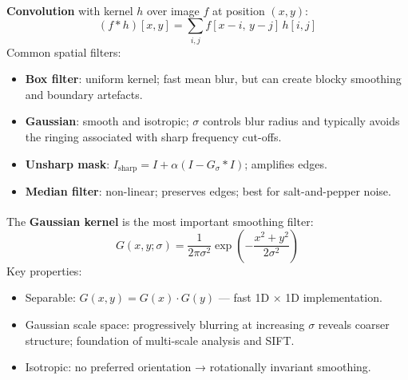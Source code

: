 \begin{tcbitemize}[ skin=sectionraster ]
    \tcbitem[title={Spatial Filtering and Convolution}, raster multicolumn=3]
    \textbf{Convolution} with kernel $h$ over image $f$ at position $(x,y)$\textsuperscript{\cite[][pp.~120--132]{gonzalezWoods2018}}:
    \begin{equation}
        (f * h)[x,y] = \sum_{i,j} f[x-i,\, y-j]\, h[i,j]
    \end{equation}
    Common spatial filters:
    \begin{itemize}
        \item \textbf{Box filter}: uniform kernel; fast mean blur, but can create blocky smoothing and boundary artefacts.
        \item \textbf{Gaussian}: smooth and isotropic; $\sigma$ controls blur radius and typically avoids the ringing associated with sharp frequency cut-offs.
        \item \textbf{Unsharp mask}: $I_{\text{sharp}} = I + \alpha(I - G_\sigma * I)$; amplifies edges.
        \item \textbf{Median filter}: non-linear; preserves edges; best for salt-and-pepper noise.
    \end{itemize}

    \tcbitem[title={Gaussian Blur}, raster multicolumn=3]
    The \textbf{Gaussian kernel} is the most important smoothing filter\textsuperscript{\cite[][pp.~138--142]{jahneDigitalImageProcessing2005}}:
    \begin{equation}
        G(x,y;\sigma) = \frac{1}{2\pi\sigma^2} \exp\!\left(-\frac{x^2+y^2}{2\sigma^2}\right)
    \end{equation}
    Key properties:
    \begin{itemize}
        \item Separable: $G(x,y) = G(x)\cdot G(y)$ — fast 1D × 1D implementation.
        \item Gaussian scale space: progressively blurring at increasing $\sigma$ reveals coarser structure; foundation of multi-scale analysis and SIFT.
        \item Isotropic: no preferred orientation → rotationally invariant smoothing.
    \end{itemize}


\end{tcbitemize}
